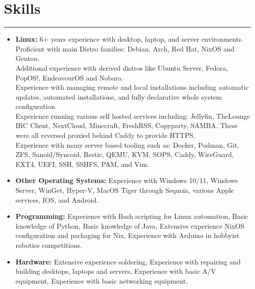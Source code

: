 \documentclass[a4paper,11pt]{article}
\begin{document}
\section*{\hspace*{1em} Skills}
\vspace{-0.2cm}
\hrule
\vspace{0.3cm}
\begin{itemize}
    \item \textbf{Linux:} 6+ years experience with desktop, laptop, and server environments. \\
    Proficient with main Distro families: Debian, Arch, Red Hat, NixOS and Gentoo. \\
    Additional experience with derived distros like Ubuntu Server, Fedora, PopOS!, EndeavourOS and Nobara. \\ 
    Experience with managing remote and local installations including automatic updates, automated installations, and fully declarative whole system configuration. \\
    Experience running various self hosted services including: Jellyfin, TheLounge IRC Client, NextCloud, Minecraft, FreshRSS, Copyparty, SAMBA. These were all reversed proxied behind Caddy to provide HTTPS. \\
    Experience with many server based tooling such as: Docker, Podman, Git, ZFS, Sanoid/Syncoid, Restic, QEMU, KVM, SOPS, Caddy, WireGuard, EXT4, UEFI, SSH, SSHFS, PAM, and Vim. \\
    \vspace{-0.7cm}
    \item \textbf{Other Operating Systems:} Experience with Windows 10/11, Windows Server, WinGet, Hyper-V, MacOS Tiger through Sequoia, various Apple services, IOS, and Android. \\
    \vspace{-0.7cm}
    \item \textbf{Programming:} Experience with Bash scripting for Linux automation, Basic knowledge of Python, Basic knowledge of Java, Extensive experience NixOS configuration and packaging for Nix, Experience with Arduino in hobbyist robotics competitions. \\
    \vspace{-0.7cm}
    \item \textbf{Hardware:} Extensive experience soldering, Experience with repairing and building desktops, laptops and servers, Experience with basic A/V equipment, Experience with basic networking equipment. \\
\end{itemize} 
\end{document}
